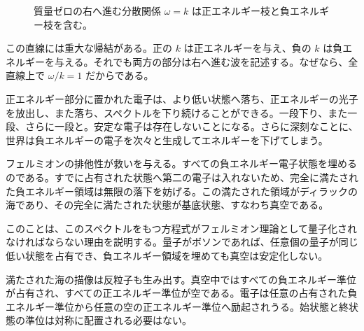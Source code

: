 \begin{figure}[htbp]
\centering
{}
\caption{質量ゼロの右へ進む分散関係 \(\omega=k\) は正エネルギー枝と負エネルギー枝を含む。}
\end{figure}

この直線には重大な帰結がある。正の \(k\) は正エネルギーを与え、負の \(k\) は負エネルギーを与える。それでも両方の部分は右へ進む波を記述する。なぜなら、全直線上で \(\omega/k=1\) だからである。

正エネルギー部分に置かれた電子は、より低い状態へ落ち、正エネルギーの光子を放出し、また落ち、スペクトルを下り続けることができる。一段下り、また一段、さらに一段と。安定な電子は存在しないことになる。さらに深刻なことに、世界は負エネルギーの電子を次々と生成してエネルギーを下げてしまう。

フェルミオンの排他性が救いを与える。すべての負エネルギー電子状態を埋めるのである。すでに占有された状態へ第二の電子は入れないため、完全に満たされた負エネルギー領域は無限の落下を妨げる。この満たされた領域がディラックの海であり、その完全に満たされた状態が基底状態、すなわち真空である。

\begin{classroomqa}
\end{classroomqa}

このことは、このスペクトルをもつ方程式がフェルミオン理論として量子化されなければならない理由を説明する。量子がボソンであれば、任意個の量子が同じ低い状態を占有でき、負エネルギー領域を埋めても真空は安定化しない。

満たされた海の描像は反粒子も生み出す。真空中ではすべての負エネルギー準位が占有され、すべての正エネルギー準位が空である。電子は任意の占有された負エネルギー準位から任意の空の正エネルギー準位へ励起されうる。始状態と終状態の準位は対称に配置される必要はない。


